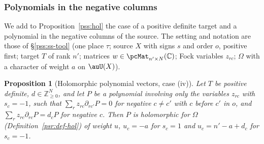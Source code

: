 \documentclass[10pt]{amsart}
\newtheorem{proposition}[theorem]{Proposition}
\theoremstyle{definition}
\theoremstyle{remark}
\newcommand{\C}{\mathbb C}
\newcommand{\Z}{\mathbb Z}
\begin{document}
\subsubsection{Polynomials in the negative columns}\label{psv:ss-hol}

We add to Proposition~\ref{pss:hol} the case of a positive definite target and a polynomial in the
negative columns of the source. The setting and notation are those of \S\ref{pss:ss-tool} (one place
$\tau$; source $X$ with signs $s$ and order $o$, positive first; target $T$ of rank $n'$; matrices
$w\in\pcMat_{n'\times N}(\C)$; Fock variables $z_{rc}$; $\Omega$ with a character of weight $a$ on
$\auU(X)$).

\begin{proposition}[Holomorphic polynomial vectors, case (iv)]\label{psv:hol4}
Let $T$ be positive definite, $d\in\Z_{\ge0}^N$, and let $P$ be a polynomial involving only the
variables $z_{rc}$ with $s_c=-1$, such that $\sum_rz_{rc}\partial_{rc'}P=0$ for negative $c\ne c'$ with
$c$ before $c'$ in $o$, and $\sum_rz_{rc}\partial_{rc}P=d_cP$ for negative $c$. Then $P$ is holomorphic for
$\Omega$ \textup(Definition~\ref{psr:def-hol}\textup) of weight $u$, $u_c=-a$ for $s_c=1$ and
$u_c=n'-a+d_c$ for $s_c=-1$.
\end{proposition}
\end{document}

